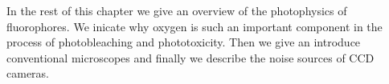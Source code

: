 In the rest of this chapter we give an overview of the photophysics of
fluorophores. We inicate why oxygen is such an important component in
the process of photobleaching and phototoxicity.  Then we give an
introduce conventional microscopes and finally we describe the noise
sources of CCD cameras.

